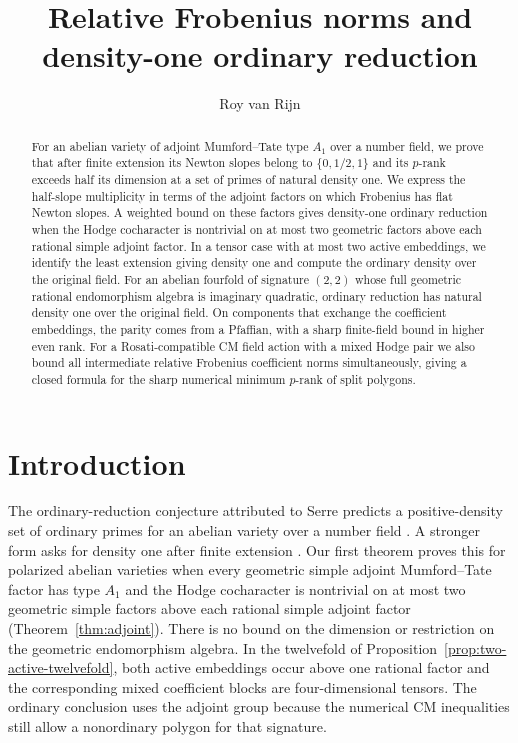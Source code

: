 \documentclass[11pt]{article}
\title{Relative Frobenius norms and density-one ordinary reduction}
\author{Roy van Rijn}
\date{}
\theoremstyle{definition}
\begin{document}
\maketitle

\begin{abstract}
For an abelian variety of adjoint Mumford--Tate type \(A_1\) over a
number field, we prove that after finite extension its Newton slopes
belong to \(\{0,1/2,1\}\) and its \(p\)-rank exceeds half its
dimension at a set of primes of natural density one. We express the
half-slope multiplicity in terms of the adjoint factors on which
Frobenius has flat Newton slopes. A weighted bound on these factors
gives density-one ordinary reduction when the Hodge cocharacter is
nontrivial on at most two geometric factors above each rational
simple adjoint factor. In a tensor case with at most two active
embeddings, we identify the least extension giving density one and
compute the ordinary density over the original field. For an abelian fourfold of
signature \((2,2)\) whose full geometric rational endomorphism algebra
is imaginary quadratic, ordinary reduction has natural density one
over the original field. On components that exchange the coefficient
embeddings, the parity comes from a Pfaffian, with a sharp finite-field
bound in higher even rank. For a Rosati-compatible
CM field action with a mixed Hodge pair we also bound all intermediate
relative Frobenius coefficient norms simultaneously, giving a closed
formula for the sharp numerical minimum \(p\)-rank of split polygons.
\end{abstract}

\section{Introduction}

The ordinary-reduction conjecture attributed to Serre predicts a
positive-density set of ordinary primes for an abelian variety over a
number field \cite{fite}. A stronger form asks for density one after
finite extension \cite[\S7]{pink}\cite[\S1.1]{cantoral}. Our first
theorem proves this for polarized abelian varieties when every
geometric simple adjoint Mumford--Tate factor has type \(A_1\) and the
Hodge cocharacter is nontrivial on at most two geometric simple
factors above each rational simple adjoint factor
(Theorem~\ref{thm:adjoint}). There is no bound on the dimension or
restriction on the geometric endomorphism algebra. In the twelvefold
of Proposition~\ref{prop:two-active-twelvefold}, both active embeddings
occur above one rational factor and the corresponding mixed coefficient
blocks are four-dimensional tensors. The ordinary conclusion uses the
adjoint group because the numerical CM inequalities still allow a
nonordinary polygon for that signature.
\end{document}
